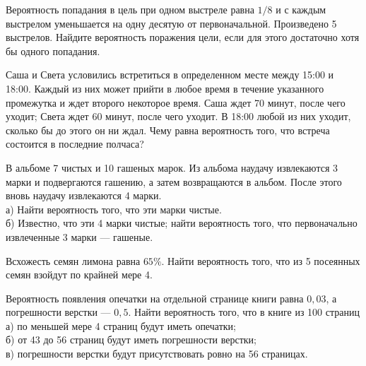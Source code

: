 \newpage\setcounter{zad}{0}



\begin{zkrW}{20}\noindent 
	Вероятность попадания в цель при одном выстреле равна $1/8$ и с каждым выстрелом уменьшается на одну десятую от первоначальной. Произведено 5 выстрелов. Найдите вероятность поражения цели, если для этого достаточно хотя бы одного попадания.
 
\end{zkrW}

\begin{zkrW}{20}\noindent 
	Саша и Света условились встретиться в определенном месте между 15:00 и 18:00. Каждый из них может прийти в любое время в течение указанного промежутка и ждет второго некоторое время. Саша ждет 70 минут, после чего уходит; Света ждет 60 минут, после чего уходит. В 18:00 любой из них уходит, сколько бы до этого он ни ждал. Чему равна вероятность того, что встреча состоится в последние полчаса?
 
\end{zkrW}

\begin{zkrW}{20}\noindent 
	В альбоме 7 чистых и 10 гашеных марок. Из альбома наудачу извлекаются 3 марки и подвергаются гашению, а затем возвращаются в альбом. После этого вновь наудачу извлекаются 4 марки. \\ \indent а) Найти вероятность того, что эти марки чистые. \\ \indent б) Известно, что эти 4 марки чистые; найти вероятность того, что первоначально извлеченные 3 марки --- гашеные.
 
\end{zkrW}

\begin{zkrW}{20}\noindent 
	Всхожесть семян лимона равна $65\%$. Найти вероятность того, что из 5 посеянных семян взойдут по крайней мере 4.
 
\end{zkrW}

\begin{zkrW}{20}\noindent 
	Вероятность появления опечатки на отдельной странице книги равна $0{,}03$, а погрешности верстки --- $0{,}5$. Найти вероятность того, что в книге из 100 страниц \\ \indent а) по меньшей мере 4 страниц будут иметь опечатки; \\ \indent б) от 43 до 56 страниц будут иметь погрешности верстки; \\ \indent в) погрешности верстки будут присутствовать ровно на 56 страницах.
 
\end{zkrW}

